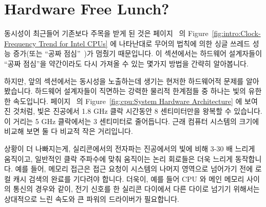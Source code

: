 
\section{Hardware Free Lunch?}
\label{sec:cpu:Hardware Free Lunch?}

동시성이 최근들어 기존보다 주목을 받게 된 것은
페이지~\pageref{fig:intro:Clock-Frequency Trend for Intel CPUs} 의
Figure~\ref{fig:intro:Clock-Frequency Trend for Intel CPUs} 에 나타난대로
무어의 법칙에 의한 싱글 쓰레드 성능 증가(또는 ``공짜
점심''~\cite{HerbSutter2008EffectiveConcurrency})가 멈췄기 때문입니다.
이 섹션에서는 하드웨어 설계자들이 ``공짜 점심''을 약간이라도 다시 가져올 수
있는 몇가지 방법을 간략히 알아봅니다.

\iffalse
The major reason that concurrency has been receiving so much focus over
the past few years is the end of Moore's-Law induced single-threaded
performance increases
(or ``free lunch''~\cite{HerbSutter2008EffectiveConcurrency}),
as shown in
Figure~\ref{fig:intro:Clock-Frequency Trend for Intel CPUs} on
page~\pageref{fig:intro:Clock-Frequency Trend for Intel CPUs}.
This section briefly surveys a few ways that hardware designers
might be able to bring back some form of the ``free lunch''.
\fi

하지만, 앞의 섹션에서는 동시성을 노출하는데 생기는 현저한 하드웨어적 문제를
알아봤습니다.
하드웨어 설계자들이 직면하는 강력한 물리적 한계점들 중 하나는 빛의 유한한
속도입니다.
페이지~\pageref{fig:cpu:System Hardware Architecture} 의
Figure~\ref{fig:cpu:System Hardware Architecture} 에 보여진 것처럼, 빛은
진공에서 1.8 GHz 클락 시간동안 8 센티미터만을 왕복할 수 있습니다.
이 거리는 5 GHz 클락에서는 3 센티미터로 줄어듭니다.
근래 컴퓨터 시스템의 크기에 비교해 보면 둘 다 비교적 작은 거리입니다.

\iffalse
However, the preceding section presented some substantial hardware
obstacles to exploiting concurrency.
One severe physical limitation that hardware designers face is the
finite speed of light.
As noted in
Figure~\ref{fig:cpu:System Hardware Architecture} on
page~\pageref{fig:cpu:System Hardware Architecture},
light can travel only about an 8-centimeters round trip
in a vacuum during the duration of a 1.8 GHz clock period.
This distance drops to about 3 centimeters for a 5 GHz clock.
Both of these distances are relatively small compared to the size
of a modern computer system.
\fi

상황이 더 나빠지는게, 실리콘에서의 전자파는 진공에서의 빛에 비해 3-30 배 느리게
움직이고, 일반적인 클락 주파수에 맞춰 움직이는 논리 회로들은 더욱 느리게
동작합니다. 예를 들어, 메모리 접근은 접근 요청이 시스템의 나머지 영역으로
넘어가기 전에 로컬 캐시 검색의 완료를 기다려야 합니다.
더욱이, 예를 들어 CPU 와 메인 메모리 사이의 통신의 경우와 같이, 전기 신호를 한
실리콘 다이에서 다른 다이로 넘기기 위해서는 상대적으로 느린 속도와 큰 파워의
드라이버가 필요합니다.

